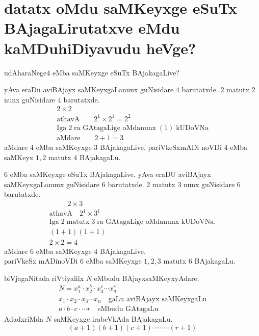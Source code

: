 \chapter{{\bf datatx oMdu saMKeyxge eSuTx BAjagaLirutatxve eMdu kaMDuhiDiyavudu heVge?}}


udAharaNege\quad $4$ eMba saMKeyxge eSuTx BAjakagaLive?

yAva eraDu aviBAjayx saMKeyxgaLanunx guNisidare $4$ barutatxde. $2$ matutx $2$ nunx guNisidare $4$ barutatxde.
\begin{gather*}
2\times 2\\
\text{athavA} \qquad 2^1\times 2^1 = 2^2\\
\text{Iga}\; 2 \;\text{ra GAtagaLige oMdanunx} \;(1)\; \text{kUDoVNa}\\
\text{aMdare}\qquad 2+1 =3
\end{gather*}
aMdare $4$ eMba saMKeyxge $3$ BAjakagaLive. pariVkeSxmADi noVDi $4$ eMba saMKeyx $1,2$ matutx $4$ BAjakagaLu. 


$6$ eMba saMKeyxge eSuTx BAjakagaLive. yAva eraDU aviBAjayx saMKeyxgaLanunx guNisidare $6$ barutatxde.
$2$ matutx $3$ nunx guNisidare $6$ barutatxde.
\begin{gather*}
\qquad\;\; 2 \times 3\\
\text{athavA}\quad 2^1 \times 3^1\\
\text{Iga} \;2\; \text{matutx} \;3\; \text{ra GAtagaLige oMdanunx kUDoVNa.}\\
(1+1)(1+1)\\
2\times 2 =4 
\end{gather*}
aMdare $6$ eMba saMKeyxge $4$ BAjakagaLive.\\
pariVkeSx mADinoVDi $6$ eMba saMKeyxge $1,2,3$ matutx $6$ BAjakagaLu.

biVjagaNitada riVtiyalilx $N$ eMbudu BAjayxsaMKeyxyAdare.
\begin{gather*}
N=x_1^a \cdot x_2^b\cdot x_3^c \cdots x_n^r\\
x_1\cdot x_2\cdot x_3 \cdots x_n \quad\text{gaLu aviBAjayx saMKeyxgaLu}\\
a \cdot b\cdot c\cdot \cdots r \quad\text{eMbudu GAtagaLu}
\end{gather*}
AdadxriMda $N$ saMKeyxge irabeVkAda BAjakagaLu.
$$
(a+1)(b+1)(c+1)\cdots\cdots\cdots(r+1)
$$

